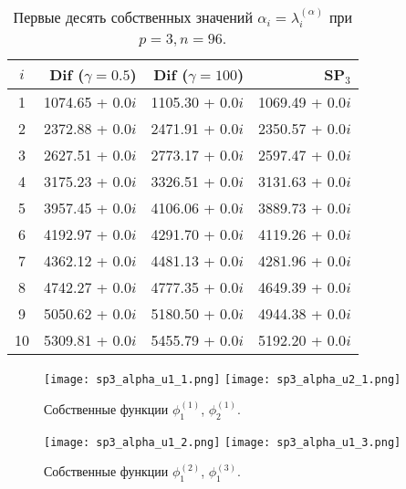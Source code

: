 \documentclass[a4paper,12pt]{article}
\begin{document}
\begin{table}[htp]
\caption{\label{tab:canonsummary}Первые десять собственных значений $\alpha_i=\lambda_i^{(\alpha)}$ при $p=3, n=96$.}
\label{table:t3-without}
\begin{center}
\begin{tabular}{c r r r}
\hline
$i$ & Dif ($\gamma=0.5$) & Dif ($\gamma=100$) & SP$_3$ \\
\hline
1 & 1074.65 + 0.0$i$& 1105.30 + 0.0$i$ & 1069.49 + 0.0$i$ \\
2 & 2372.88 + 0.0$i$& 2471.91 + 0.0$i$ & 2350.57 + 0.0$i$ \\
3 & 2627.51 + 0.0$i$& 2773.17 + 0.0$i$ & 2597.47 + 0.0$i$ \\
4 & 3175.23 + 0.0$i$& 3326.51 + 0.0$i$ & 3131.63 + 0.0$i$ \\
5 & 3957.45 + 0.0$i$& 4106.06 + 0.0$i$ & 3889.73 + 0.0$i$ \\
6 & 4192.97 + 0.0$i$& 4291.70 + 0.0$i$ & 4119.26 + 0.0$i$ \\
7 & 4362.12 + 0.0$i$& 4481.13 + 0.0$i$ & 4281.96 + 0.0$i$ \\
8 & 4742.27 + 0.0$i$& 4777.35 + 0.0$i$ & 4649.39 + 0.0$i$ \\
9 & 5050.62 + 0.0$i$& 5180.50 + 0.0$i$ & 4944.38 + 0.0$i$ \\
10& 5309.81 + 0.0$i$& 5455.79 + 0.0$i$ & 5192.20 + 0.0$i$ \\
\hline
\end{tabular}
\end{center}
\end{table}

\begin{figure}[htp]
\begin{center}
	\texttt{[image: sp3\_alpha\_u1\_1.png]}
	\texttt{[image: sp3\_alpha\_u2\_1.png]}\\
	\caption{\label{image:canonsummary}Собственные функции $\phi_1^{(1)}$, $\phi_2^{(1)}$.}
	\label{ris:eigen1_without}
\end{center}
\end{figure}

\begin{figure}[htp]
\begin{center}
	\texttt{[image: sp3\_alpha\_u1\_2.png]}
	\texttt{[image: sp3\_alpha\_u1\_3.png]}\\
	\caption{\label{image:canonsummary}Собственные функции $\phi_1^{(2)}$, $\phi_1^{(3)}$.}
	\label{ris:eigen2_without}
\end{center}
\end{figure}
\end{document}
